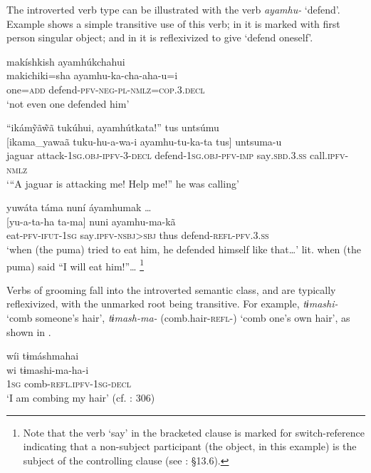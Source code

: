\documentclass[output=paper]{langscibook}
\begin{document}
The introverted verb type can be illustrated with the verb \textit{ayamhu-} ‘defend’. Example  shows a simple transitive use of this verb; in  it is marked with first person singular object; and in  it is reflexivized to give ‘defend oneself’.

\ea%
    \label{ex:overall:24}
    \glll makíshkish ayamhúkchahui\\
  makichiki=sha  ayamhu-ka-cha-aha-u=i\\
  one=\textsc{add}  defend-\textsc{pfv-neg-pl-nmlz=cop.3.decl}\\
  \glt  ‘not even one defended him’ \citep[195]{Overall2017}
\z

\ea%
    \label{ex:overall:25}
    \glll “ikámỹã\~{w}ã tukúhui, ayamhútkata!” tus untsúmu\\
  {}[ikama\_yawaã  tuku-hu-a-wa-i  ayamhu-tu-ka-ta tus]  untsuma-u\\
  jaguar  attack-\textsc{1sg.obj-ipfv-3-decl}  defend-\textsc{1sg.obj-pfv-imp} say\textsc{.sbd.3.ss}  call\textsc{.ipfv-nmlz}\\
  \glt  ‘“A jaguar is attacking me! Help me!” he was calling’ \citep[561]{Overall2017}
  \z

\ea%
    \label{ex:overall:26}
    \glll yuwáta táma nuní áyamhumak {…}\\
  {}[yu-a-ta-ha  ta-ma]  nuni ayamhu-ma-kã { }\\
  eat\textsc{{}-pfv-ifut-1sg} say\textsc{.ipfv-nsbj>sbj}  thus  defend-\textsc{refl-pfv.3.ss} { }\\
  \glt  ‘when (the puma) tried to eat him, he defended himself like that…’ lit. when (the puma) said “I will eat him!”… \citep[565]{Overall2017}\footnote{Note that the verb ‘say’ in the bracketed clause is marked for switch-reference indicating that a non-subject participant (the object, in this example) is the subject of the controlling clause (see \citealt{Overall2017}: \S 13.6).}
\z

Verbs of grooming fall into the introverted semantic class, and are typically reflexivized, with the unmarked root being transitive. For example, \textit{tɨmashi-} ‘comb someone’s hair’, \textit{tɨmash-ma-} (comb.hair-\textsc{refl-}) ‘comb one’s own hair’, as shown in .

\ea%
    \label{ex:overall:27}
    \glll wíi tɨmáshmahai\\
  wi  tɨmashi-ma-ha-i\\
 1\textsc{sg}  comb-\textsc{refl.ipfv-1sg-decl}\\
  \glt  ‘I am combing my hair’ (cf. \citealt{Overall2017}: 306)
\z
\end{document}
